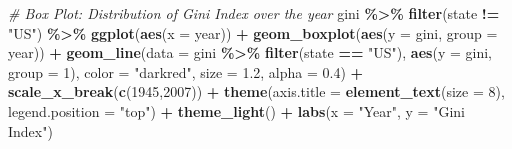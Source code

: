 \documentclass[11pt,a4paper,]{article}
\newenvironment{Shaded}{\begin{snugshade}}{\end{snugshade}}
\newcommand{\AttributeTok}[1]{\textcolor[rgb]{0.13,0.29,0.53}{#1}}
\newcommand{\CommentTok}[1]{\textcolor[rgb]{0.56,0.35,0.01}{\textit{#1}}}
\newcommand{\DecValTok}[1]{\textcolor[rgb]{0.00,0.00,0.81}{#1}}
\newcommand{\FloatTok}[1]{\textcolor[rgb]{0.00,0.00,0.81}{#1}}
\newcommand{\FunctionTok}[1]{\textcolor[rgb]{0.13,0.29,0.53}{\textbf{#1}}}
\newcommand{\NormalTok}[1]{#1}
\newcommand{\OtherTok}[1]{\textcolor[rgb]{0.56,0.35,0.01}{#1}}
\newcommand{\SpecialCharTok}[1]{\textcolor[rgb]{0.81,0.36,0.00}{\textbf{#1}}}
\newcommand{\StringTok}[1]{\textcolor[rgb]{0.31,0.60,0.02}{#1}}
\begin{document}
\begin{Shaded}
\end{Shaded}

\begin{Shaded}
\begin{Highlighting}[]
\CommentTok{\# Box Plot: Distribution of Gini Index over the year}
\NormalTok{gini }\SpecialCharTok{\%\textgreater{}\%} 
  \FunctionTok{filter}\NormalTok{(state }\SpecialCharTok{!=} \StringTok{"US"}\NormalTok{) }\SpecialCharTok{\%\textgreater{}\%}  
  \FunctionTok{ggplot}\NormalTok{(}\FunctionTok{aes}\NormalTok{(}\AttributeTok{x =}\NormalTok{ year)) }\SpecialCharTok{+} 
  \FunctionTok{geom\_boxplot}\NormalTok{(}\FunctionTok{aes}\NormalTok{(}\AttributeTok{y =}\NormalTok{ gini, }\AttributeTok{group =}\NormalTok{ year)) }\SpecialCharTok{+}
  \FunctionTok{geom\_line}\NormalTok{(}\AttributeTok{data =}\NormalTok{ gini }\SpecialCharTok{\%\textgreater{}\%} \FunctionTok{filter}\NormalTok{(state }\SpecialCharTok{==} \StringTok{"US"}\NormalTok{), }
            \FunctionTok{aes}\NormalTok{(}\AttributeTok{y =}\NormalTok{ gini, }\AttributeTok{group =} \DecValTok{1}\NormalTok{), }
            \AttributeTok{color =} \StringTok{"darkred"}\NormalTok{, }\AttributeTok{size =} \FloatTok{1.2}\NormalTok{, }\AttributeTok{alpha =} \FloatTok{0.4}\NormalTok{) }\SpecialCharTok{+}
  \FunctionTok{scale\_x\_break}\NormalTok{(}\FunctionTok{c}\NormalTok{(}\DecValTok{1945}\NormalTok{,}\DecValTok{2007}\NormalTok{)) }\SpecialCharTok{+} 
  \FunctionTok{theme}\NormalTok{(}\AttributeTok{axis.title =} \FunctionTok{element\_text}\NormalTok{(}\AttributeTok{size =} \DecValTok{8}\NormalTok{), }
        \AttributeTok{legend.position =} \StringTok{"top"}\NormalTok{) }\SpecialCharTok{+}
  \FunctionTok{theme\_light}\NormalTok{() }\SpecialCharTok{+}
  \FunctionTok{labs}\NormalTok{(}\AttributeTok{x =} \StringTok{"Year"}\NormalTok{, }\AttributeTok{y =} \StringTok{"Gini Index"}\NormalTok{) }
\end{Highlighting}
\end{Shaded}
\end{document}
